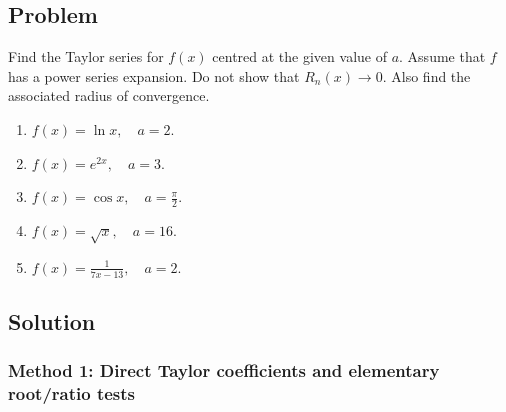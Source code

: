 \documentclass[12pt]{article}
\begin{document}
\subsection{Problem}
Find the Taylor series for \(f(x)\) centred at the given value of \(a\). Assume that
\(f\) has a power series expansion. Do not show that \(R_n(x)\to 0\). Also find the
associated radius of convergence.

\begin{enumerate}[label=(\alph*)]
  \item \(f(x)=\ln x,\quad a=2.\)
  \item \(f(x)=e^{2x},\quad a=3.\)
  \item \(f(x)=\cos x,\quad a=\frac{\pi}{2}.\)
  \item \(f(x)=\sqrt{x},\quad a=16.\)
  \item \(f(x)=\frac{1}{7x-13},\quad a=2.\)
\end{enumerate}


\bigskip
\subsection{Solution}
\subsubsection{Method 1: Direct Taylor coefficients and elementary root/ratio tests}
\end{document}

